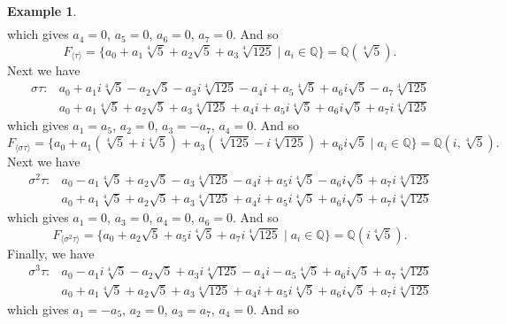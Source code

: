 \documentclass[leqno]{article}
\theoremstyle{definition}
\theoremstyle{remark}
\theoremstyle{definition}
\newtheorem{example}{Example}
\begin{document}
\begin{example}
\begin{align*}
            \end{align*}
        which gives $a_4=0$, $a_5=0$, $a_6=0$, $a_7=0$. And so 
            \begin{equation*}
                F_{\langle\tau\rangle}=\{a_0+a_1\sqrt[4]{5}+a_2\sqrt{5}+a_3\sqrt[4]{125}\mid a_i\in\mathbb{Q}\}=\mathbb{Q}(\sqrt[4]{5}).
            \end{equation*}\newpage
        Next we have 
            \begin{align*}
                \sigma\tau:&a_0+a_1i\sqrt[4]{5}-a_2\sqrt{5}-a_3i\sqrt[4]{125}-a_4i+a_5\sqrt[4]{5}+a_6i\sqrt{5}-a_7\sqrt[4]{125} \\
                &a_0+a_1\sqrt[4]{5}+a_2\sqrt{5}+a_3\sqrt[4]{125}+a_4i+a_5i\sqrt[4]{5}+a_6i\sqrt{5}+a_7i\sqrt[4]{125}
            \end{align*}
        which gives $a_1=a_5$, $a_2=0$, $a_3=-a_7$, $a_4=0$. And so 
            \begin{equation*}
                F_{\langle\sigma\tau\rangle}=\{a_0+a_1(\sqrt[4]{5}+i\sqrt[4]{5})+a_3(\sqrt[4]{125}-i\sqrt[4]{125})+a_6i\sqrt{5}\mid a_i\in\mathbb{Q}\}=\mathbb{Q}(i,\sqrt[4]{5}).
            \end{equation*}
        Next we have 
            \begin{align*}
                \sigma^2\tau:&a_0-a_1\sqrt[4]{5}+a_2\sqrt{5}-a_3\sqrt[4]{125}-a_4i+a_5i\sqrt[4]{5}-a_6i\sqrt{5}+a_7i\sqrt[4]{125} \\
                &a_0+a_1\sqrt[4]{5}+a_2\sqrt{5}+a_3\sqrt[4]{125}+a_4i+a_5i\sqrt[4]{5}+a_6i\sqrt{5}+a_7i\sqrt[4]{125}
            \end{align*}
        which gives $a_1=0$, $a_3=0$, $a_4=0$, $a_6=0$. And so 
            \begin{equation*}
                F_{\langle\sigma^2\tau\rangle}=\{a_0+a_2\sqrt{5}+a_5i\sqrt[4]{5}+a_7i\sqrt[4]{125}\mid a_i\in\mathbb{Q}\}=\mathbb{Q}(i\sqrt[4]{5}).
            \end{equation*}
        Finally, we have 
            \begin{align*}
                \sigma^3\tau:&a_0-a_1i\sqrt[4]{5}-a_2\sqrt{5}+a_3i\sqrt[4]{125}-a_4i-a_5\sqrt[4]{5}+a_6i\sqrt{5}+a_7\sqrt[4]{125} \\
                &a_0+a_1\sqrt[4]{5}+a_2\sqrt{5}+a_3\sqrt[4]{125}+a_4i+a_5i\sqrt[4]{5}+a_6i\sqrt{5}+a_7i\sqrt[4]{125}
            \end{align*}
        which gives $a_1=-a_5$, $a_2=0$, $a_3=a_7$, $a_4=0$. And so 
            \begin{equation*}

\end{equation*}
\end{example}
\end{document}
